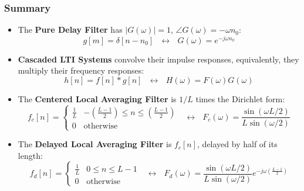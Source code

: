 \documentclass{beamer}
\begin{document}
\begin{frame}
  \frametitle{Summary}
  \begin{itemize}
  \item The {\bf Pure Delay Filter} has $|G(\omega)|=1$, $\angle G(\omega)=-\omega n_0$:
    \[
    g[m]=\delta[n-n_0]~~~\leftrightarrow~~~G(\omega) = e^{-j\omega n_0}
    \]
  \item {\bf Cascaded LTI Systems} convolve their impulse responses, equivalently, they
    multiply their frequency responses:
    \[
    h[n]=f[n]\ast g[n]~~~\leftrightarrow~~~H(\omega)=F(\omega)G(\omega)
    \]
  \item The {\bf Centered Local Averaging Filter} is $1/L$ times
    the Dirichlet form:
    \[
    f_c[n] = \begin{cases}
      \frac{1}{L} & -\left(\frac{L-1}{2}\right)\le n\le \left(\frac{L-1}{2}\right)\\
      0 & \mbox{otherwise}
    \end{cases}~~~\leftrightarrow~~~
    F_c(\omega)=\frac{\sin(\omega L/2)}{L\sin(\omega/2)}
    \]
  \item The {\bf Delayed Local Averaging Filter} is $f_c[n]$, delayed by half of its length:
    \[
    f_d[n] = \begin{cases}
      \frac{1}{L} & 0\le n\le L-1\\
      0 & \mbox{otherwise}
    \end{cases}~~~\leftrightarrow~~~
    F_d(\omega)=\frac{\sin(\omega L/2)}{L\sin(\omega/2)}e^{-j\omega\left(\frac{L-1}{2}\right)}
    \]
  \end{itemize}
\end{frame}
\end{document}
